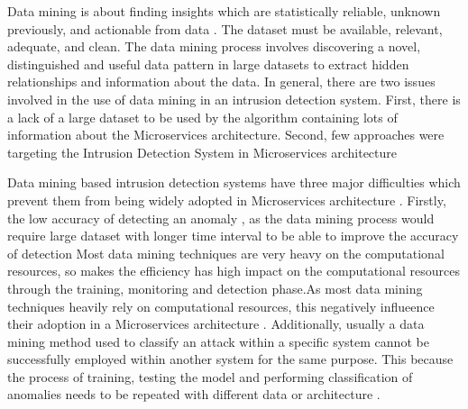 \documentclass[sigconf]{acmart}
\begin{document}
Data mining is about finding insights which are statistically reliable, unknown previously, and actionable from data \cite{phua2010comprehensive}. The dataset must be available, relevant, adequate, and clean. The data mining process involves discovering a novel, distinguished and useful data pattern in large datasets to extract hidden relationships and information about the data. In general, there are two issues involved in the use of data mining in an intrusion detection system. First, there is a lack of a large dataset to be used by the algorithm containing lots of information about the Microservices architecture. Second, few approaches were targeting the Intrusion Detection System in Microservices architecture \cite{phua2010comprehensive}

Data mining based intrusion detection systems have three major difficulties which prevent them from being widely adopted in Microservices architecture \cite{lunt1992real,Patcha:2007hja}. Firstly, the low accuracy of detecting an anomaly \cite{gupta2016network,Patcha:2007hja}, as the data mining process would require large dataset with longer time interval to be able to improve the accuracy of detection 
Most data mining techniques are very heavy on the computational resources, so makes the efficiency has high impact on the computational resources through the training, monitoring and detection phase.As most data mining techniques heavily rely on computational resources, this negatively influeence their adoption  in a Microservices architecture  \cite{Patcha:2007hja}. Additionally, usually a data mining method used to classify an attack within a specific system cannot be successfully employed within another system for the same purpose. This because the process of training, testing the model and performing classification of anomalies needs to be repeated with different data or architecture \cite{Buczak:2016kt}.  
\end{document}
